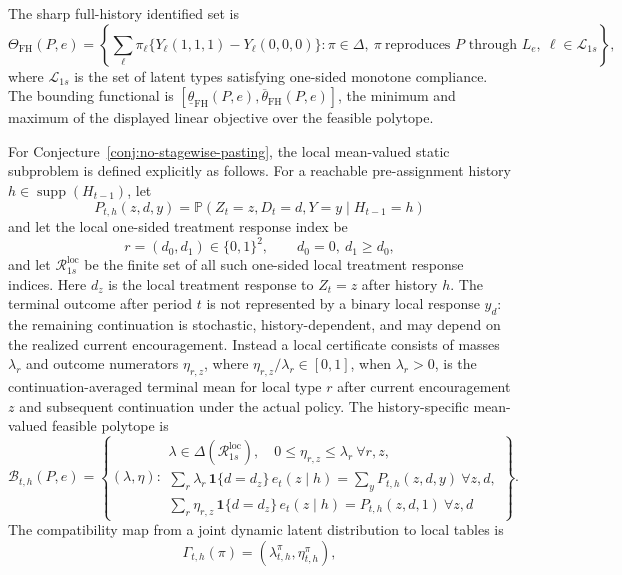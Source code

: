 \documentclass[11pt]{article}
\renewcommand{\Pr}{\mathbb{P}}
\newcommand{\one}{\mathbf{1}}
\theoremstyle{definition}
\theoremstyle{plain}
\theoremstyle{remark}
\begin{document}
The sharp full-history identified set is
\[
\Theta_{\mathrm{FH}}(P,e)=
\left\{\sum_\ell \pi_\ell\{Y_\ell(1,1,1)-Y_\ell(0,0,0)\}:
\pi\in\Delta,\ \pi\ \text{reproduces }P\text{ through }L_e,\ \ell\in\mathcal{L}_{1s}\right\},
\]
where \(\mathcal{L}_{1s}\) is the set of latent types satisfying one-sided monotone compliance.  The bounding functional is \([\underline\theta_{\mathrm{FH}}(P,e),\overline\theta_{\mathrm{FH}}(P,e)]\), the minimum and maximum of the displayed linear objective over the feasible polytope.

For Conjecture~\ref{conj:no-stagewise-pasting}, the local mean-valued static subproblem is defined explicitly as follows.  For a reachable pre-assignment history \(h\in\operatorname{supp}(H_{t-1})\), let
\[
P_{t,h}(z,d,y)=\Pr(Z_t=z,D_t=d,Y=y\mid H_{t-1}=h)
\]
and let the local one-sided treatment response index be
\[
r=(d_0,d_1)\in\{0,1\}^2,\qquad d_0=0,\ d_1\ge d_0,
\]
and let \(\mathcal{R}_{1s}^{\mathrm{loc}}\) be the finite set of all such one-sided local treatment response indices.  Here \(d_z\) is the local treatment response to \(Z_t=z\) after history \(h\).  The terminal outcome after period \(t\) is not represented by a binary local response \(y_d\): the remaining continuation is stochastic, history-dependent, and may depend on the realized current encouragement.  Instead a local certificate consists of masses \(\lambda_r\) and outcome numerators \(\eta_{r,z}\), where \(\eta_{r,z}/\lambda_r\in[0,1]\), when \(\lambda_r>0\), is the continuation-averaged terminal mean for local type \(r\) after current encouragement \(z\) and subsequent continuation under the actual policy.  The history-specific mean-valued feasible polytope is
\[
\mathcal{B}_{t,h}(P,e)=
\left\{(\lambda,\eta):
\begin{array}{l}
\lambda\in\Delta(\mathcal{R}_{1s}^{\mathrm{loc}}),\quad
0\le \eta_{r,z}\le \lambda_r\ \forall r,z,\\[2mm]
\sum_r\lambda_r\,\one\{d=d_z\}\,e_t(z\mid h)=\sum_y P_{t,h}(z,d,y)\ \forall z,d,\\[2mm]
\sum_r\eta_{r,z}\,\one\{d=d_z\}\,e_t(z\mid h)=P_{t,h}(z,d,1)\ \forall z,d
\end{array}
\right\}.
\]
The compatibility map from a joint dynamic latent distribution to local tables is
\[
\Gamma_{t,h}(\pi)=(\lambda^\pi_{t,h},\eta^\pi_{t,h}),
\]
\end{document}
